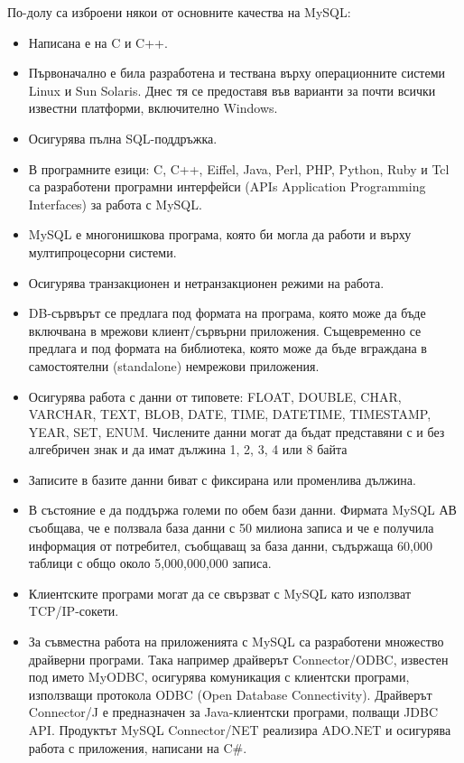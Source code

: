 По-долу са изброени някои от основните качества на MySQL:
\begin{itemize}
\item Написана е на C и C++.

\item Първоначално е била разработена и тествана върху операционните системи
Linux и Sun Solaris. Днес тя се предоставя във варианти за почти
всички известни платформи, включително Windows.

\item Осигурява пълна SQL-поддръжка.

\item В програмните езици: C, C++, Eiffel, Java, Perl, PHP, Python, Ruby и
Tcl са разработени програмни интерфейси (APIs Application Programming
Interfaces) за работа с MySQL.

\item MySQL е многонишкова програма, която би могла да работи и върху
мултипроцесорни системи.

\item Осигурява транзакционен и нетранзакционен режими на работа.

\item DB-сървърът се предлага под формата на програма, която може да бъде
включвана в мрежови клиент/сървърни приложения. Същевременно се
предлага и под формата на библиотека, която може да бъде вграждана в
самостоятелни (standalone) немрежови приложения.

\item Осигурява работа с данни от типовете: FLOAT, DOUBLE, CHAR, VARCHAR,
TEXT, BLOB, DATE, TIME, DATETIME, TIMESTAMP, YEAR, SET,
ENUM. Числените данни могат да бъдат представяни с и без алгебричен
знак и да имат дължина 1, 2, 3, 4 или 8 байта

\item Записите в базите данни биват с фиксирана или променлива дължина.

\item В състояние е да поддържа големи по обем бази данни. Фирмата MySQL АВ
съобщава, че е ползвала база данни с 50 милиона записа и че е получила
информация от потребител, съобщаващ за база данни, съдържаща 60,000
таблици с общо около 5,000,000,000 записа.

\item Клиентските програми могат да се свързват с MySQL като използват TCP/IP-сокети.

\item За съвместна работа на приложенията с MySQL са разработени множество
драйверни програми. Така например драйверът Connector/ODBC, известен
под името MyODBC, осигурява комуникация с клиентски програми,
използващи протокола ODBC (Open Database Connectivity). Драйверът
Connector/J е предназначен за Java-клиентски програми, полващи JDBC
API. Продуктът MySQL Connector/NET реализира ADO.NET и осигурява
работа с приложения, написани на C\#.
\end{itemize}
